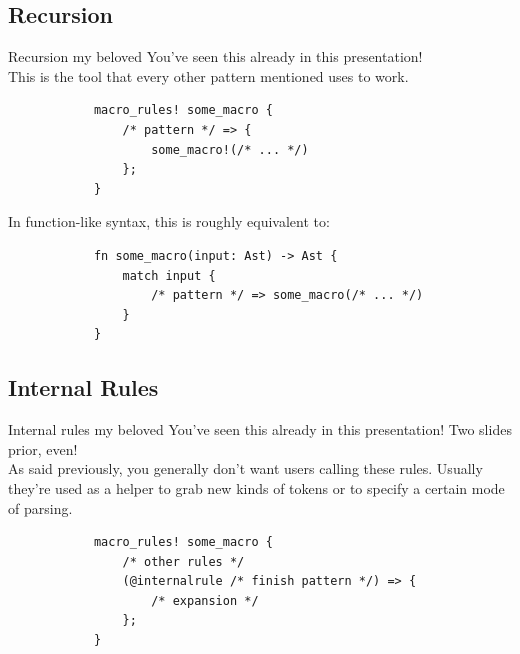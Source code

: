 \documentclass{beamer}
\begin{document}
	\subsection{Recursion}
	\begin{frame}[fragile]{Recursion my beloved}
		You've seen this already in this presentation! \\

		This is the tool that every other pattern mentioned uses to work.

		\begin{verbatim}
			macro_rules! some_macro {
				/* pattern */ => {
					some_macro!(/* ... */)
				};
			}
		\end{verbatim}
		In function-like syntax, this is roughly equivalent to:
		\begin{verbatim}
			fn some_macro(input: Ast) -> Ast {
				match input {
					/* pattern */ => some_macro(/* ... */)
				}
			}
		\end{verbatim}
	\end{frame}

	\subsection{Internal Rules}
	\begin{frame}[fragile]{Internal rules my beloved}
		You've seen this already in this presentation! Two slides prior, even! \\

		As said previously, you generally don't want users calling these rules. Usually they're used
		as a helper to grab new kinds of tokens or to specify a certain mode of parsing.

		\begin{verbatim}
			macro_rules! some_macro {
				/* other rules */
				(@internalrule /* finish pattern */) => {
					/* expansion */
				};
			}
		\end{verbatim}
	\end{frame}
\end{document}
